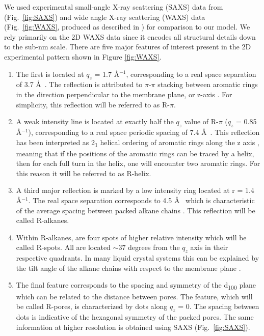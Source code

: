 \documentclass{article}
\newcommand{\angstrom}{\textup{\AA}}
\begin{document}
  We used experimental small-angle X-ray scattering (SAXS) data from
  \cite{feng_thin_2016} (Fig.~\ref{fig:SAXS}) and wide angle X-ray scattering
  (WAXS) data (Fig.~\ref{fig:WAXS}, produced as described in
  \cite{feng_scalable_2014}) for comparison to our model. We rely primarily on the 2D WAXS data
  since it encodes all structural details down to the sub-nm scale.  There are
  five major features of interest present in the 2D experimental pattern shown in
  Figure \ref{fig:WAXS}.

  \begin{enumerate} 
  
  	\item The first is located at $q_z$ = 1.7 \angstrom$^{-1}$, corresponding to
	a real space separation of 3.7 \angstrom~.  The reflection is attributed to
	$\pi$-$\pi$ stacking between aromatic rings in the direction perpendicular to
	the membrane plane, or z-axis \cite{feng_scalable_2014}. For simplicity, this
	reflection will be referred to as R-$\pi$.
 
	\item A weak intensity line is located at exactly half the $q_z$ value
	of R-$\pi$ ($q_z$ = 0.85 \angstrom$^{-1}$), corresponding to a real space
	periodic spacing of 7.4 \angstrom~. This reflection has been interpreted as
	2\textsubscript{1} helical ordering of aromatic rings along the z axis
	\cite{feng_scalable_2014}, meaning that if the positions of the aromatic rings
	can be traced by a helix, then for each full turn in the helix, one will
	encounter two aromatic rings. For this reason it will be referred to as
	R-helix. 

	\item A third major reflection is marked by a low intensity ring
	located at r = 1.4 \angstrom$^{-1}$. The real space separation corresponds to
	4.5 \angstrom~ which is characteristic of the average spacing between packed
	alkane chains \cite{mcintosh_organization_1980}. This reflection will be called
	R-alkanes.

	\item Within R-alkanes, are four spots of higher relative intensity
	which will be called R-spots. All are located $\sim 37$ degrees from the $q_z$
	axis in their respective quadrants. In many liquid crystal systems this can be
	explained by the tilt angle of the alkane chains with respect to the membrane
	plane \cite{govind_simple_2001}.
 
	\item The final feature corresponds to the spacing and symmetry of the
	d\textsubscript{100} plane which can be related to the distance between pores.
	The feature, which will be called R-pores, is characterized by dots along $q_z$
	= 0. The spacing between dots is indicative of the hexagonal symmetry of the
	packed pores. The same information at higher resolution is obtained using SAXS (Fig.~\ref{fig:SAXS}). 

  \end{enumerate}
\end{document}
